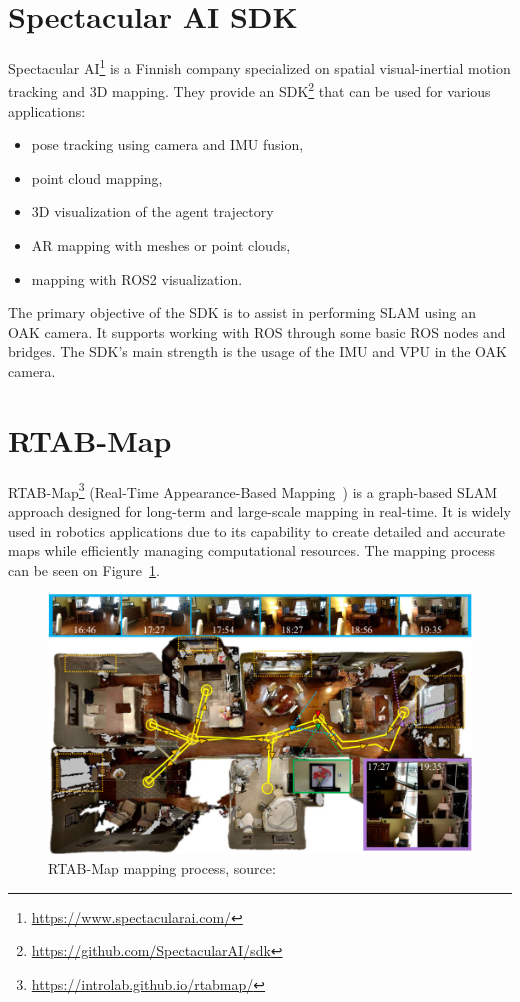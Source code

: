 \FloatBarrier
\section{Spectacular AI SDK}

Spectacular AI\footnote{\url{https://www.spectacularai.com/}} is a Finnish company specialized on spatial visual-inertial motion tracking and 3D mapping. They provide an SDK\footnote{\url{https://github.com/SpectacularAI/sdk}} that can be used for various applications:
\FloatBarrier
\begin{itemize}
\setlength\itemsep{0em}
    \item pose tracking using camera and IMU fusion,
    \item point cloud mapping,
    \item 3D visualization of the agent trajectory
    \item AR mapping with meshes or point clouds,
    \item mapping with ROS2 visualization.
\end{itemize}
\FloatBarrier
The primary objective of the SDK is to assist in performing SLAM using an OAK camera. It supports working with ROS through some basic ROS nodes and bridges. The SDK's main strength is the usage of the IMU and VPU in the OAK camera.


\section{RTAB-Map}

RTAB-Map\footnote{\url{https://introlab.github.io/rtabmap/}} (Real-Time Appearance-Based Mapping~\cite{RTAB_Map_docs}) is a graph-based SLAM approach designed for long-term and large-scale mapping in real-time. It is widely used in robotics applications due to its capability to create detailed and accurate maps while efficiently managing computational resources. The mapping process can be seen on Figure~\ref{fig:rtabmap_applied_techs}.

\begin{figure}[htbp]
    \centering
    \includegraphics[width=150mm, keepaspectratio]{figures_jpg/rtabmap_for_applied_techs.jpg}
    \caption{RTAB-Map mapping process, source:~\cite{rtabmap_applied_techs}}
    \label{fig:rtabmap_applied_techs}
\end{figure}

